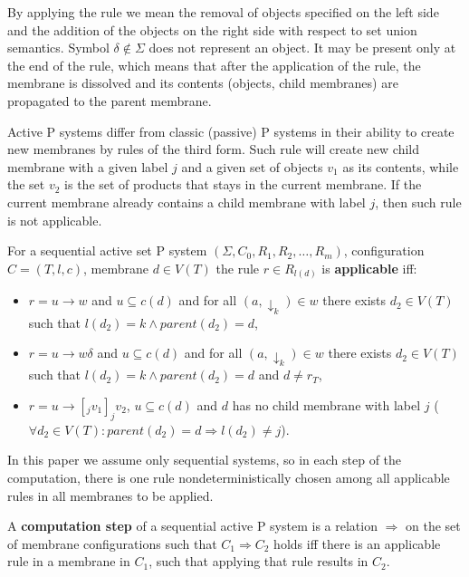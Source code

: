 By applying the rule we mean the removal of objects specified on the left side and the addition of the objects on the right side with respect to set union semantics.
Symbol $\delta\notin\Sigma$ does not represent an object. It may be present only at the end of the rule, which means that after the application of the rule, the membrane is dissolved and its contents (objects, child membranes) are propagated to the parent membrane.

Active P systems differ from classic (passive) P systems in their ability to create new membranes by rules of the third form. Such rule will create new child membrane with a given label $j$ and a given set of objects $v_1$ as its contents, while the set $v_2$ is the set of products that stays in the current membrane. If the current membrane already contains a child membrane with label $j$, then such rule is not applicable.


For a sequential active set P system $(\Sigma, C_0, R_1, R_2, \dots , R_m)$, configuration $C = (T, l, c)$, membrane $d\in V(T)$ the rule $r\in R_{l(d)}$ is {\bf applicable} iff:
\begin{itemize}
  \item $r = u\rightarrow w$ and $u\subseteq c(d)$ and for all $(a,\downarrow_k)\in w$ there exists $d_2\in V(T)$ such that $l(d_2)=k \wedge parent(d_2) = d$,
  \item $r = u\rightarrow w\delta$ and $u\subseteq c(d)$ and for all $(a,\downarrow_k)\in w$ there exists $d_2\in V(T)$ such that $l(d_2)=k \wedge parent(d_2) = d$ and $d\neq r_T$,
  \item $r = u\rightarrow [_j v_1]_j v_2$, $u\subseteq c(d)$ and $d$ has no child membrane with label $j$ ($\forall d_2\in V(T):  parent(d_2)=d \Rightarrow l(d_2)\neq j$).
\end{itemize}

In this paper we assume only sequential systems, so in each step of the computation, there is one rule nondeterministically chosen among all applicable rules in all membranes to be applied.


A {\bf computation step} of a sequential active P system is a relation $\Rightarrow$ on the set of membrane configurations such that $C_1 \Rightarrow C_2$ holds iff there is an applicable rule in a membrane in $C_1$, such that applying that rule results in $C_2$.


